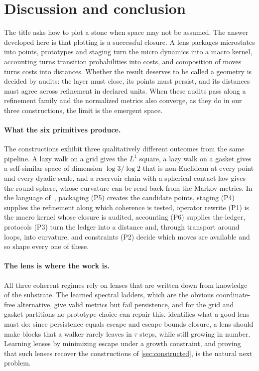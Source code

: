 \documentclass[11pt]{article}
\begin{document}
 \section{Discussion and conclusion}
\label{sec:conclusion}

The title asks how to plot a stone when space may not be assumed.
The answer developed here is that plotting is a successful closure.
A lens packages microstates into points, prototypes and staging turn the micro dynamics into a macro kernel, accounting turns transition probabilities into costs, and composition of moves turns costs into distances.
Whether the result deserves to be called a geometry is decided by audits: the layer must close, its points must persist, and its distances must agree across refinement in declared units.
When these audits pass along a refinement family and the normalized metrics also converge, as they do in our three constructions, the limit is the emergent space.

\paragraph{What the six primitives produce.}
The constructions exhibit three qualitatively different outcomes from the same pipeline.
A lazy walk on a grid gives the $L^1$ square, a lazy walk on a gasket gives a self-similar space of dimension $\log3/\log2$ that is non-Euclidean at every point and every dyadic scale, and a reservoir chain with a spherical contact law gives the round sphere, whose curvature can be read back from the Markov metrics.
In the language of~\cite{SixBirdsTheory}, packaging (P5) creates the candidate points, staging (P4) supplies the refinement along which coherence is tested, operator rewrite (P1) is the macro kernel whose closure is audited, accounting (P6) supplies the ledger, protocols (P3) turn the ledger into a distance and, through transport around loops, into curvature, and constraints (P2) decide which moves are available and so shape every one of these.

\paragraph{The lens is where the work is.}
All three coherent regimes rely on lenses that are written down from knowledge of the substrate.
The learned spectral ladders, which are the obvious coordinate-free alternative, give valid metrics but fail persistence, and for the grid and gasket partitions no prototype choice can repair this.
 identifies what a good lens must do: since persistence equals escape and escape bounds closure, a lens should make blocks that a walker rarely leaves in $\tau$ steps, while still growing in number.
Learning lenses by minimizing escape under a growth constraint, and proving that such lenses recover the constructions of \cref{sec:constructed}, is the natural next problem.
\end{document}
